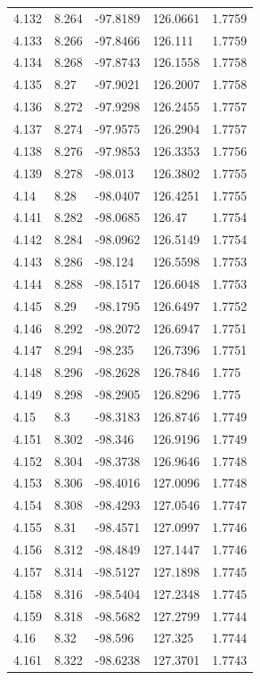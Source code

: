 \begin{tabular}{lllll}
4.132 & 8.264 & -97.8189 & 126.0661 & 1.7759 \\
4.133 & 8.266 & -97.8466 & 126.111 & 1.7759 \\
4.134 & 8.268 & -97.8743 & 126.1558 & 1.7758 \\
4.135 & 8.27 & -97.9021 & 126.2007 & 1.7758 \\
4.136 & 8.272 & -97.9298 & 126.2455 & 1.7757 \\
4.137 & 8.274 & -97.9575 & 126.2904 & 1.7757 \\
4.138 & 8.276 & -97.9853 & 126.3353 & 1.7756 \\
4.139 & 8.278 & -98.013 & 126.3802 & 1.7755 \\
4.14 & 8.28 & -98.0407 & 126.4251 & 1.7755 \\
4.141 & 8.282 & -98.0685 & 126.47 & 1.7754 \\
4.142 & 8.284 & -98.0962 & 126.5149 & 1.7754 \\
4.143 & 8.286 & -98.124 & 126.5598 & 1.7753 \\
4.144 & 8.288 & -98.1517 & 126.6048 & 1.7753 \\
4.145 & 8.29 & -98.1795 & 126.6497 & 1.7752 \\
4.146 & 8.292 & -98.2072 & 126.6947 & 1.7751 \\
4.147 & 8.294 & -98.235 & 126.7396 & 1.7751 \\
4.148 & 8.296 & -98.2628 & 126.7846 & 1.775 \\
4.149 & 8.298 & -98.2905 & 126.8296 & 1.775 \\
4.15 & 8.3 & -98.3183 & 126.8746 & 1.7749 \\
4.151 & 8.302 & -98.346 & 126.9196 & 1.7749 \\
4.152 & 8.304 & -98.3738 & 126.9646 & 1.7748 \\
4.153 & 8.306 & -98.4016 & 127.0096 & 1.7748 \\
4.154 & 8.308 & -98.4293 & 127.0546 & 1.7747 \\
4.155 & 8.31 & -98.4571 & 127.0997 & 1.7746 \\
4.156 & 8.312 & -98.4849 & 127.1447 & 1.7746 \\
4.157 & 8.314 & -98.5127 & 127.1898 & 1.7745 \\
4.158 & 8.316 & -98.5404 & 127.2348 & 1.7745 \\
4.159 & 8.318 & -98.5682 & 127.2799 & 1.7744 \\
4.16 & 8.32 & -98.596 & 127.325 & 1.7744 \\
4.161 & 8.322 & -98.6238 & 127.3701 & 1.7743 \\

\end{tabular}
